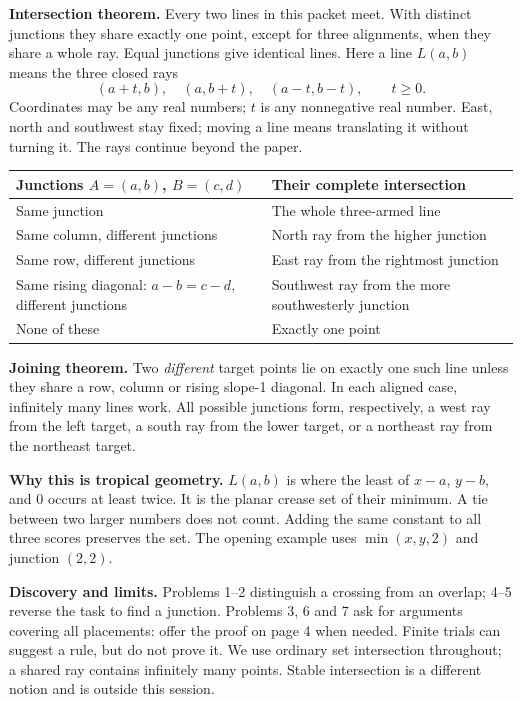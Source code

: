 \documentclass[11pt,letterpaper]{article}
\newcommand{\head}[1]{\par\vspace{4pt}{\large\bfseries #1}\par\vspace{1pt}}
\begin{document}
\head{The mathematical destination}
\textbf{Intersection theorem.} Every two lines in this packet meet. With distinct junctions they share exactly one point, except for three alignments, when they share a whole ray. Equal junctions give identical lines. Here a line $L(a,b)$ means the three closed rays
\[
 (a+t,b),\quad (a,b+t),\quad (a-t,b-t),\qquad t\geq0.
\]
Coordinates may be any real numbers; $t$ is any nonnegative real number. East, north and southwest stay fixed; moving a line means translating it without turning it. The rays continue beyond the paper.

\par\noindent\begin{tabularx}{\linewidth}{@{}p{2.43in}X@{}}
\textbf{Junctions $A=(a,b)$, $B=(c,d)$} & \textbf{Their complete intersection}\\\hline
Same junction & The whole three-armed line\\
Same column, different junctions & North ray from the higher junction\\
Same row, different junctions & East ray from the rightmost junction\\
Same rising diagonal: $a-b=c-d$, different junctions & Southwest ray from the more southwesterly junction\\
None of these & Exactly one point
\end{tabularx}

\textbf{Joining theorem.} Two \emph{different} target points lie on exactly one such line unless they share a row, column or rising slope-1 diagonal. In each aligned case, infinitely many lines work. All possible junctions form, respectively, a west ray from the left target, a south ray from the lower target, or a northeast ray from the northeast target.

\textbf{Why this is tropical geometry.} $L(a,b)$ is where the least of $x-a$, $y-b$, and $0$ occurs at least twice. It is the planar crease set of their minimum. A tie between two larger numbers does not count. Adding the same constant to all three scores preserves the set. The opening example uses $\min(x,y,2)$ and junction $(2,2)$.

\textbf{Discovery and limits.} Problems 1--2 distinguish a crossing from an overlap; 4--5 reverse the task to find a junction. Problems 3, 6 and 7 ask for arguments covering all placements: offer the proof on page 4 when needed. Finite trials can suggest a rule, but do not prove it. We use ordinary set intersection throughout; a shared ray contains infinitely many points. Stable intersection is a different notion and is outside this session.
\end{document}
